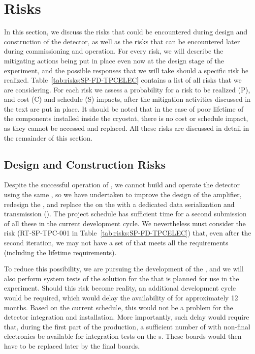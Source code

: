 \section{Risks}
\label{sec:fdsp-tpcelec-risks}

In this section, we discuss the risks that could be encountered during design
and construction of the   detector, as well as the
risks that can be encountered later during commissioning and operation.
For every risk, we will describe the mitigating actions 
being put in place even now at the design stage of the experiment, and the 
possible responses that we will take should a specific risk be realized. 
Table~\ref{tab:risks:SP-FD-TPCELEC} contains a list of all risks that we are 
considering. For each risk we assess a probability for a risk to be
realized (P), and  cost (C) and schedule (S) impacts, after the 
mitigation activities discussed in the text are put in place. It should
be noted that in the case of poor lifetime of the %
components installed inside the cryostat, there is no cost or schedule
impact, as they cannot be accessed and replaced.
All these risks are discussed in detail in the remainder of this
section.



\subsection{Design and Construction Risks}
\label{sec:fdsp-tpcelec-risks-design}

Despite the successful operation of , we cannot build and operate
the   detector using the same , so we have
undertaken to improve the design of the  amplifier, redesign
the , and replace the  on the  with a dedicated data
serialization and transmission  (). The project schedule has
sufficient time for a second submission of all these  in the current 
development cycle. We  nevertheless must consider the risk (RT-SP-TPC-001
in Table~\ref{tab:risks:SP-FD-TPCELEC}) that, even after the second iteration, 
we may not have a set of  that meets all the  requirements
(including the lifetime requirements). 

To reduce this possibility, we are pursuing the development of the  , and we
will also perform system tests of the  solution for the  that is planned 
for use in the  experiment. Should this risk become reality, an
additional development cycle would be required, which would delay the availability
of  for approximately 12 months. Based on the current schedule, this would
not be a problem for the detector integration and installation.
More importantly, such delay would require
that, during the first part of the  production, a sufficient number
of  with non-final electronics be available for integration tests
on the s. These boards would then have to be replaced later
by the final boards.

